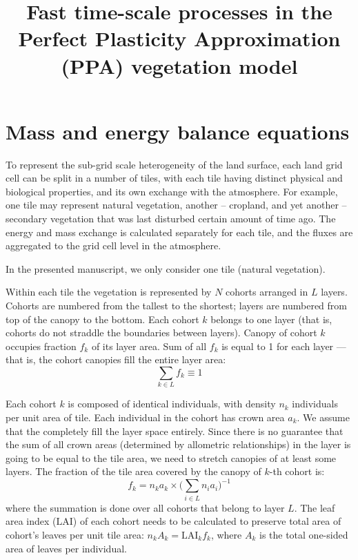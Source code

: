 \documentclass{article}
\title{Fast time-scale processes in the Perfect 
Plasticity Approximation (PPA) vegetation model}
\newcommand{\LAI}{\ensuremath{\text{LAI}}}
\newcommand{\nindivs}{n}         %
\newcommand{\crownArea}{a}       %
\newcommand{\layerfrac}{f}       %
\begin{document}
\maketitle
\pagestyle{headings}


\section{Mass and energy balance equations}

To represent the sub-grid scale heterogeneity of the land surface, each land
grid cell can be split in a number of tiles, with each tile having distinct
physical and biological properties, and its own exchange with the atmosphere.
For example, one tile may represent natural vegetation, another -- cropland, and
yet another -- secondary vegetation that was last disturbed certain amount of
time ago. The energy and mass exchange is calculated separately for each tile,
and the fluxes are aggregated to the grid cell level in the atmosphere.

In the presented manuscript, we only consider one tile (natural vegetation).

Within each tile the vegetation is represented by $N$ cohorts arranged in $L$
layers. Cohorts are numbered from the tallest to the shortest; layers are numbered from
top of the canopy to the bottom. Each cohort $k$ belongs to one layer
(that is, cohorts do not straddle the boundaries between layers). Canopy of
cohort $k$ occupies fraction $\layerfrac_k$ of its layer area. Sum of all
$\layerfrac_k$ is equal to 1 for each layer --- that is, the cohort canopies
fill the entire layer area:
\begin{equation}
   \sum_{k \in L} \layerfrac_k \equiv 1
\end{equation}

Each cohort $k$ is composed of identical individuals, with density $\nindivs_k$
individuals per unit area of tile. Each individual in the cohort has crown area
$\crownArea_k$. We assume that the completely fill the layer space entirely. Since
there is no guarantee that the sum of all crown areas (determined by allometric
relationships) in the layer is going to be equal to the tile area, we need to
stretch canopies of at least some layers. The fraction of the tile area covered
by the canopy of $k$-th cohort is:
%
\begin{equation}
   \label{cohort-frac}
   \layerfrac_k = \nindivs_k \crownArea_k \times
     \big(\sum_{i \in L}\nindivs_i\crownArea_i\big)^{-1}
\end{equation}
%
where the summation is done over all cohorts that belong to layer $L$. 
The leaf area index (\LAI) of each cohort needs to be calculated to preserve
total area of cohort's leaves per unit tile area: $\nindivs_k A_k = \LAI_k
\layerfrac_k$, where $A_k$ is the total one-sided area of leaves per individual.
\end{document}
